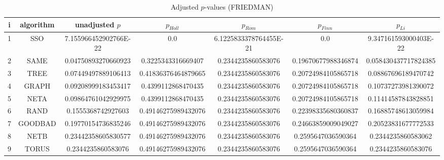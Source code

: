 \documentclass[a4paper,10pt]{article}
\begin{document}
\begin{landscape}
\begin{table}[!htp]
\centering\scriptsize
\caption{Adjusted $p$-values (FRIEDMAN)}
\begin{tabular}{ccccccc}
i&algorithm&unadjusted $p$&$p_{Holl}$&$p_{Rom}$&$p_{Finn}$&$p_{Li}$\\
\hline
1& SSO&7.155966452902766E-22&0.0&6.1225833378764455E-21&0.0&9.347161593000403E-22\\
2& SAME&0.04750893270660923&0.3225343316669407&0.2344235860583076&0.19670677988346874&0.058430437717824385\\
3& TREE&0.07449497889106413&0.41836376464879665&0.2344235860583076&0.20724984105865718&0.08867696189470742\\
4& GRAPH&0.09208999183453417&0.4399112868470435&0.2344235860583076&0.20724984105865718&0.10737273981390072\\
5& NETA&0.09864761042929975&0.4399112868470435&0.2344235860583076&0.20724984105865718&0.11414587843828851\\
6& RAND&0.1555368742927603&0.49146275989432076&0.2344235860583076&0.22398335680360837&0.16885748613059984\\
7& GOODBAD&0.19770154736835246&0.49146275989432076&0.2344235860583076&0.24663859009049027&0.20523831677772533\\
8& NETB&0.23442358605830577&0.49146275989432076&0.2344235860583076&0.2595647036590364&0.2344235860583062\\
9& TORUS&0.2344235860583076&0.49146275989432076&0.2344235860583076&0.2595647036590364&0.2344235860583076\\
\hline
\end{tabular}
\end{table}


\newpage


\end{landscape}
\end{document}
